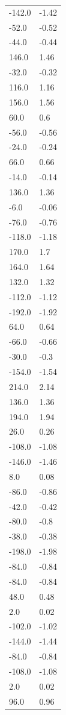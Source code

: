 \begin{longtable}{ll}
-142.0 & -1.42 \\
-52.0 & -0.52 \\
-44.0 & -0.44 \\
146.0 & 1.46 \\
-32.0 & -0.32 \\
116.0 & 1.16 \\
156.0 & 1.56 \\
60.0 & 0.6 \\
-56.0 & -0.56 \\
-24.0 & -0.24 \\
66.0 & 0.66 \\
-14.0 & -0.14 \\
136.0 & 1.36 \\
-6.0 & -0.06 \\
-76.0 & -0.76 \\
-118.0 & -1.18 \\
170.0 & 1.7 \\
164.0 & 1.64 \\
132.0 & 1.32 \\
-112.0 & -1.12 \\
-192.0 & -1.92 \\
64.0 & 0.64 \\
-66.0 & -0.66 \\
-30.0 & -0.3 \\
-154.0 & -1.54 \\
214.0 & 2.14 \\
136.0 & 1.36 \\
194.0 & 1.94 \\
26.0 & 0.26 \\
-108.0 & -1.08 \\
-146.0 & -1.46 \\
8.0 & 0.08 \\
-86.0 & -0.86 \\
-42.0 & -0.42 \\
-80.0 & -0.8 \\
-38.0 & -0.38 \\
-198.0 & -1.98 \\
-84.0 & -0.84 \\
-84.0 & -0.84 \\
48.0 & 0.48 \\
2.0 & 0.02 \\
-102.0 & -1.02 \\
-144.0 & -1.44 \\
-84.0 & -0.84 \\
-108.0 & -1.08 \\
2.0 & 0.02 \\
96.0 & 0.96 \\

\end{longtable}
